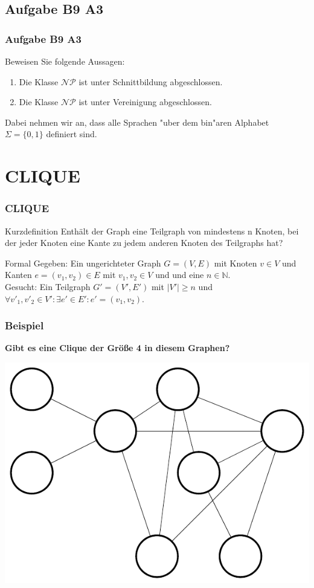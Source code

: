 \subsection{Aufgabe B9 A3}
\begin{frame}
	\frametitle{Aufgabe B9 A3}
	Beweisen Sie folgende Aussagen:
	\begin{enumerate}
	\item Die Klasse $\mathcal{NP}$ ist unter Schnittbildung abgeschlossen.
	\item Die Klasse $\mathcal{NP}$ ist unter Vereinigung abgeschlossen.
	\end{enumerate}
	Dabei nehmen wir an, dass alle Sprachen "uber dem bin"aren Alphabet $\Sigma =
	\{0,1\}$ definiert sind.
\end{frame}

\section{CLIQUE}
\begin{frame}
	\frametitle{CLIQUE}
	\begin{block}{Kurzdefinition}
	Enthält der Graph eine Teilgraph von mindestens n Knoten, bei der jeder Knoten eine Kante zu jedem anderen Knoten des Teilgraphs hat?
	\end{block}
	\begin{block}{Formal}
	Gegeben: Ein ungerichteter Graph $G = (V,E)$ mit Knoten $v \in V$ und Kanten $e=(v_1, v_2)\in E$ mit $v_1, v_2 \in V$ und und eine $n \in \mathbb{N}$.\\
	Gesucht: Ein Teilgraph $G' = (V',E')$ mit $|V'|\ge n$ und $\forall v'_1, v'_2\in V':\exists e'\in E': e'=(v_1,v_2)$.
	\end{block}
\end{frame}
\begin{frame}
	\frametitle{Beispiel}
	\textbf{Gibt es eine Clique der Größe 4 in diesem Graphen?}
	\begin{center}
	\includegraphics[scale=0.6]{images/4CLIQUE}	
	\end{center}
\end{frame}
